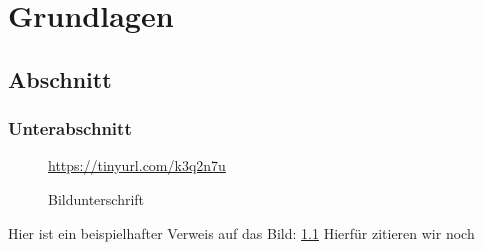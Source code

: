 \chapter{Grundlagen}
\section{Abschnitt} 
\subsection{Unterabschnitt}
\begin{figure}
\caption{Bildunterschrift}
\quelle\url{https://tinyurl.com/k3q2n7u} 
\label{Grundlagen:LabelDesPlatzhalters}
\end{figure}

Hier ist ein beispielhafter Verweis auf das Bild: \ref{Grundlagen:LabelDesPlatzhalters} 
Hierfür zitieren wir noch \cite{Anderson.2015}